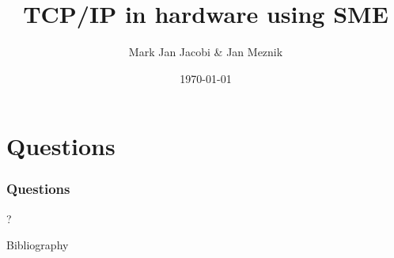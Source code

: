 \documentclass{beamer}
\title{TCP/IP in hardware using SME}
\author{Mark Jan Jacobi \& Jan Meznik}
\institute{KU}
\date{\today}
\begin{document}
\frame{\titlepage}
















\section{Questions}
\begin{frame}
  \frametitle{Questions}
  \begin{center}
    ?
  \end{center}
\end{frame}

\begin{frame}{Bibliography}


\end{frame}



\end{document}
